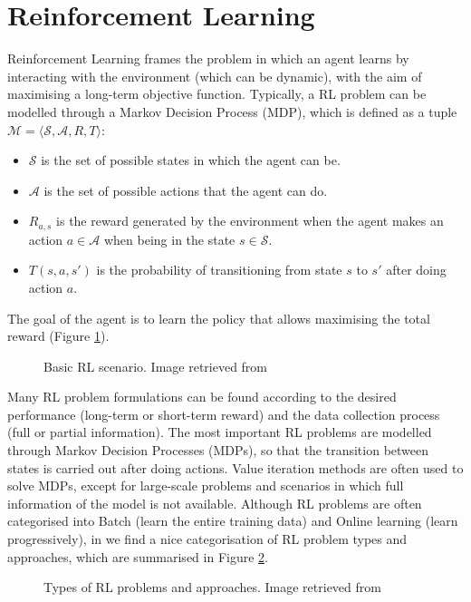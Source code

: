 \documentclass[12pt, a4paper,twoside]{tesi_upf}
\begin{document}
		\section{Reinforcement Learning}
		\label{section:rl}				
			Reinforcement Learning frames the problem in which an agent learns by interacting with the environment (which can be dynamic), with the aim of maximising a long-term objective function. Typically, a RL problem can be modelled through a Markov Decision Process (MDP), which is defined as a tuple $\mathcal{M} = \langle \mathcal{S}, \mathcal{A}, R, T\rangle$:
			\begin{itemize}
				\item $\mathcal{S}$ is the set of possible states in which the agent can be.
				\item $\mathcal{A}$ is the set of possible actions that the agent can do.
				\item $R_{a,s}$ is the reward generated by the environment  when the agent makes an action $a \in \mathcal{A}$ when being in the state $s \in \mathcal{S}$.
				\item $T(s,a,s')$ is the probability of transitioning from state $s$ to $s'$ after doing action $a$.
			\end{itemize}
			The goal of the agent is to learn the policy that allows maximising the total reward (Figure \ref{fig:rl_scenario}). 
			\begin{figure}[h!]
				\centering
				\caption{Basic RL scenario. Image retrieved from \cite{sutton1998reinforcement}}
				\label{fig:rl_scenario}
			\end{figure}		
		
			Many RL problem formulations can be found according to the desired performance (long-term or short-term reward) and the data collection process (full or partial information). The most important RL problems are modelled through Markov Decision Processes (MDPs), so that the transition between states is carried out after doing actions. Value iteration methods are often used to solve MDPs, except for large-scale problems and scenarios in which full information of the model is not available. 
			Although RL problems are often categorised into Batch (learn the entire training data) and Online learning (learn progressively), in \cite{szepesvari2010algorithms} we find a nice categorisation of RL problem types and approaches, which are summarised in Figure \ref{fig:rl_types}.			
			\begin{figure}[h!]
				\centering
				\caption{Types of RL problems and approaches. Image retrieved from \cite{szepesvari2010algorithms}}
				\label{fig:rl_types}
			\end{figure}
					
\end{document}
